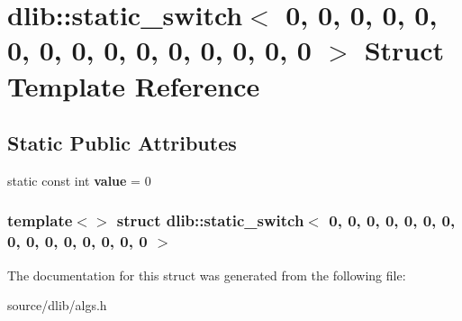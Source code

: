 \hypertarget{structdlib_1_1static__switch_3_010_00_010_00_010_00_010_00_010_00_010_00_010_00_010_00_010_00_01297db704ac0ccd7cdf569f49ff1837f4}{
\section{dlib::static\_\-switch$<$ 0, 0, 0, 0, 0, 0, 0, 0, 0, 0, 0, 0, 0, 0, 0 $>$ Struct Template Reference}
\label{structdlib_1_1static__switch_3_010_00_010_00_010_00_010_00_010_00_010_00_010_00_010_00_010_00_01297db704ac0ccd7cdf569f49ff1837f4}
}
\subsection*{Static Public Attributes}
\begin{DoxyCompactItemize}
\item 
\hypertarget{structdlib_1_1static__switch_3_010_00_010_00_010_00_010_00_010_00_010_00_010_00_010_00_010_00_01297db704ac0ccd7cdf569f49ff1837f4_aaa907d7a6b034f114953e0269d53379c}{
static const int {\bfseries value} = 0}
\label{structdlib_1_1static__switch_3_010_00_010_00_010_00_010_00_010_00_010_00_010_00_010_00_010_00_01297db704ac0ccd7cdf569f49ff1837f4_aaa907d7a6b034f114953e0269d53379c}

\end{DoxyCompactItemize}
\subsubsection*{template$<$$>$ struct dlib::static\_\-switch$<$ 0, 0, 0, 0, 0, 0, 0, 0, 0, 0, 0, 0, 0, 0, 0 $>$}



The documentation for this struct was generated from the following file:\begin{DoxyCompactItemize}
\item 
source/dlib/algs.h\end{DoxyCompactItemize}
